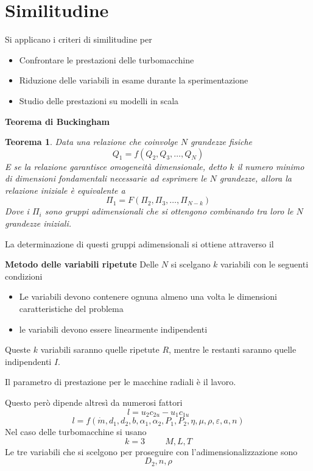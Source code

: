 \documentclass[a4paper, 15pt]{article}
\begin{document}
\section{Similitudine}
\begin{adjustwidth}{2in}{}
	Si applicano i criteri di similitudine per 
	\begin{itemize}
		\item Confrontare le prestazioni delle turbomacchine 
		\item Riduzione delle variabili in esame durante la sperimentazione
		\item Studio delle prestazioni su modelli in scala
	\end{itemize}
		

\textbf{{\large Teorema di Buckingham}}
		\newtheorem{theorem}{Teorema}
		\begin{theorem}
			Data una relazione che coinvolge $N$ grandezze fisiche \[Q_1 = f(Q_2, Q_3, \dots, Q_N)\] E se la relazione garantisce omogeneità dimensionale, detto $k$ il numero minimo di dimensioni fondamentali necessarie ad esprimere le $N$ grandezze, allora la relazione iniziale è equivalente a \[\Pi_1 = F(\Pi_2, \Pi_3, \dots, \Pi_{N-k})\] Dove i $\Pi_i$ sono gruppi adimensionali che si ottengono combinando tra loro le $N$ grandezze iniziali. 
		\end{theorem}	
		La determinazione di questi gruppi adimensionali si ottiene attraverso il \newline
		
		\textbf{{\large Metodo delle variabili ripetute}}
		Delle $N$ si scelgano $k$ variabili con le seguenti condizioni
		\begin{itemize}
			\item Le variabili devono contenere ognuna almeno una volta le dimensioni caratteristiche del problema
			\item le variabili devono essere linearmente indipendenti
		\end{itemize}
		Queste $k$ variabili saranno quelle ripetute $R$, mentre le restanti saranno quelle indipendenti $I$. \newline 
		
		Il parametro di prestazione per le macchine radiali è  il lavoro.
		
		Questo però dipende altresì da numerosi fattori
		\[l = u_2c_{2u} - u_1c_{1u}\]
		\[l = f(\dot{m}, d_1, d_2, b, \alpha_1, \alpha_2, P_1, P_2, \eta, \mu, \rho, \varepsilon, a, n)\]
		Nel caso delle turbomacchine si usano
		\[k = 3\hspace{1cm} M, L, T\]			 	 		
		Le tre variabili che si scelgono per proseguire con l'adimensionalizzazione sono
		\[D_2, n, \rho\]
		

\end{adjustwidth}
\end{document}
